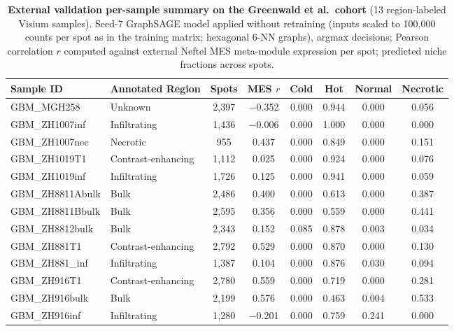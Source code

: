 \documentclass[11pt,letterpaper]{article}
\begin{document}
\begin{table}[H]
\centering
\caption{\textbf{External validation per-sample summary on the Greenwald et al.\ cohort} (13 region-labeled Visium samples). Seed-7 GraphSAGE model applied without retraining (inputs scaled to 100{,}000 counts per spot as in the training matrix; hexagonal 6-NN graphs), argmax decisions; Pearson correlation $r$ computed against external Neftel MES meta-module expression per spot; predicted niche fractions across spots.}
\label{tab:s1}
\footnotesize
\setlength{\tabcolsep}{4pt}
\begin{tabular}{llcccccc}
\toprule
\textbf{Sample ID} & \textbf{Annotated Region} & \textbf{Spots} & \textbf{MES $r$} & \textbf{Cold} & \textbf{Hot} & \textbf{Normal} & \textbf{Necrotic} \\
\midrule
GBM\_MGH258 & Unknown & 2{,}397 & $-$0.352 & 0.000 & 0.944 & 0.000 & 0.056 \\
GBM\_ZH1007inf & Infiltrating & 1{,}436 & $-$0.006 & 0.000 & 1.000 & 0.000 & 0.000 \\
GBM\_ZH1007nec & Necrotic & 955 & 0.437 & 0.000 & 0.849 & 0.000 & 0.151 \\
GBM\_ZH1019T1 & Contrast-enhancing & 1{,}112 & 0.025 & 0.000 & 0.924 & 0.000 & 0.076 \\
GBM\_ZH1019inf & Infiltrating & 1{,}726 & 0.125 & 0.000 & 0.941 & 0.000 & 0.059 \\
GBM\_ZH8811Abulk & Bulk & 2{,}486 & 0.400 & 0.000 & 0.613 & 0.000 & 0.387 \\
GBM\_ZH8811Bbulk & Bulk & 2{,}595 & 0.356 & 0.000 & 0.559 & 0.000 & 0.441 \\
GBM\_ZH8812bulk & Bulk & 2{,}343 & 0.152 & 0.085 & 0.878 & 0.003 & 0.034 \\
GBM\_ZH881T1 & Contrast-enhancing & 2{,}792 & 0.529 & 0.000 & 0.870 & 0.000 & 0.130 \\
GBM\_ZH881\_inf & Infiltrating & 1{,}387 & 0.104 & 0.000 & 0.876 & 0.030 & 0.094 \\
GBM\_ZH916T1 & Contrast-enhancing & 2{,}780 & 0.559 & 0.000 & 0.719 & 0.000 & 0.281 \\
GBM\_ZH916bulk & Bulk & 2{,}199 & 0.576 & 0.000 & 0.463 & 0.004 & 0.533 \\
GBM\_ZH916inf & Infiltrating & 1{,}280 & $-$0.201 & 0.000 & 0.759 & 0.241 & 0.000 \\
\bottomrule
\end{tabular}
\end{table}

\clearpage
\end{document}
